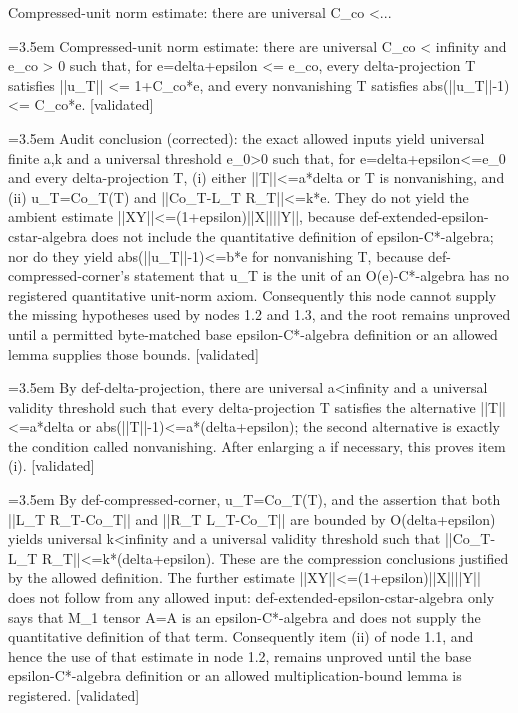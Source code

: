 \documentclass{article}
\newcommand{\step}[1]{\par\noindent\hangindent=3.5em\hangafter=1%
  \makebox[3.5em][l]{\textbf{#1.}}}
\newcommand{\steptag}[1]{\hfill{\small\textsf{[#1]}}}
\begin{document}
\begin{proofbox}{Compressed-unit norm estimate: there are universal C\_co <...}
\step{1} Compressed-unit norm estimate: there are universal C\_co < infinity and e\_co > 0 such that, for e=delta+epsilon <= e\_co, every delta-projection T satisfies ||u\_T|| <= 1+C\_co*e, and every nonvanishing T satisfies abs(||u\_T||-1) <= C\_co*e. \steptag{validated} \\[6pt]
\step{1.1} Audit conclusion (corrected): the exact allowed inputs yield universal finite a,k and a universal threshold e\_0>0 such that, for e=delta+epsilon<=e\_0 and every delta-projection T, (i) either ||T||<=a*delta or T is nonvanishing, and (ii) u\_T=Co\_T(T) and ||Co\_T-L\_T R\_T||<=k*e. They do not yield the ambient estimate ||XY||<=(1+epsilon)||X||||Y||, because def-extended-epsilon-cstar-algebra does not include the quantitative definition of epsilon-C*-algebra; nor do they yield abs(||u\_T||-1)<=b*e for nonvanishing T, because def-compressed-corner's statement that u\_T is the unit of an O(e)-C*-algebra has no registered quantitative unit-norm axiom. Consequently this node cannot supply the missing hypotheses used by nodes 1.2 and 1.3, and the root remains unproved until a permitted byte-matched base epsilon-C*-algebra definition or an allowed lemma supplies those bounds. \steptag{validated} \\[6pt]
\step{1.1.1} By def-delta-projection, there are universal a<infinity and a universal validity threshold such that every delta-projection T satisfies the alternative ||T||<=a*delta or abs(||T||-1)<=a*(delta+epsilon); the second alternative is exactly the condition called nonvanishing. After enlarging a if necessary, this proves item (i). \steptag{validated} \\[4pt]
\step{1.1.2} By def-compressed-corner, u\_T=Co\_T(T), and the assertion that both ||L\_T R\_T-Co\_T|| and ||R\_T L\_T-Co\_T|| are bounded by O(delta+epsilon) yields universal k<infinity and a universal validity threshold such that ||Co\_T-L\_T R\_T||<=k*(delta+epsilon). These are the compression conclusions justified by the allowed definition. The further estimate ||XY||<=(1+epsilon)||X||||Y|| does not follow from any allowed input: def-extended-epsilon-cstar-algebra only says that M\_1 tensor A=A is an epsilon-C*-algebra and does not supply the quantitative definition of that term. Consequently item (ii) of node 1.1, and hence the use of that estimate in node 1.2, remains unproved until the base epsilon-C*-algebra definition or an allowed multiplication-bound lemma is registered. \steptag{validated} \\[4pt]

\end{proofbox}
\end{document}

